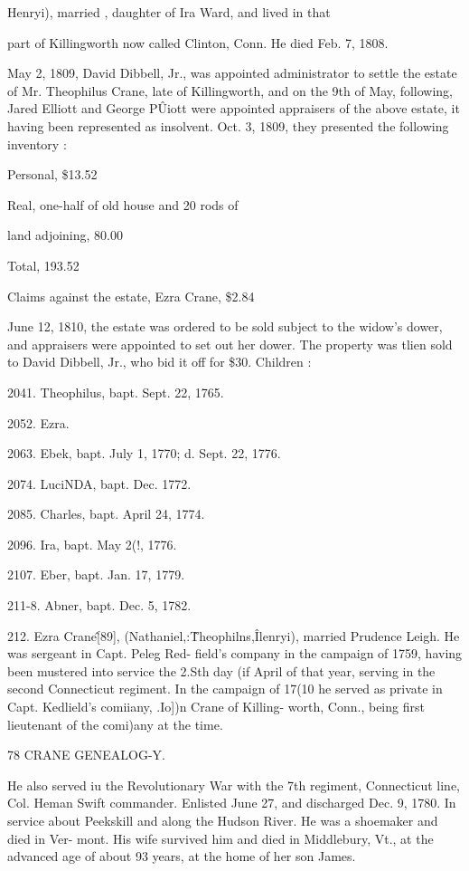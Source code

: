 Henryi), married , daughter of Ira Ward, and lived in that 

part of Killingworth now called Clinton, Conn. He died Feb. 
7, 1808. 

May 2, 1809, David Dibbell, Jr., was appointed administrator 
to settle the estate of Mr. Theophilus Crane, late of Killingworth, 
and on the 9th of May, following, Jared Elliott and George 
P\^Uiott were appointed appraisers of the above estate, it having 
been represented as insolvent. Oct. 3, 1809, they presented the 
following inventory : 

Personal, \$13.52 

Real, one-half of old house and 20 rods of 

land adjoining, 80.00 

Total, 193.52 

Claims against the estate, Ezra Crane, \$2.84 

June 12, 1810, the estate was ordered to be sold subject to the 
widow's dower, and appraisers were appointed to set out her 
dower. The property was tlien sold to David Dibbell, Jr., who 
bid it off for \$30. Children : 

2041. Theophilus, bapt. Sept. 22, 1765. 

2052. Ezra. 

2063. Ebek, bapt. July 1, 1770; d. Sept. 22, 1776. 

2074. LuciNDA, bapt. Dec. 1772. 

2085. Charles, bapt. April 24, 1774. 

2096. Ira, bapt. May 2(!, 1776. 

2107. Eber, bapt. Jan. 17, 1779. 

211-8. Abner, bapt. Dec. 5, 1782. 

212. Ezra Crane\^ [89], (Nathaniel,:\^ Theophilns,\^ Ilenryi), 
married Prudence Leigh. He was sergeant in Capt. Peleg Red- 
field's company in the campaign of 1759, having been mustered 
into service the 2.Sth day (if April of that year, serving in the 
second Connecticut regiment. In the campaign of 17(10 he served 
as private in Capt. Kedlield's comiiany, .Io])n Crane of Killing- 
worth, Conn., being first lieutenant of the comi)any at the time. 



78 CRANE GENEALOG-Y. 

He also served iu the Revolutionary War with the 7th regiment, 
Connecticut line, Col. Heman Swift commander. Enlisted June 
27, and discharged Dec. 9, 1780. In service about Peekskill and 
along the Hudson River. He was a shoemaker and died in Ver- 
mont. His wife survived him and died in Middlebury, Vt., at 
the advanced age of about 93 years, at the home of her son James. 

